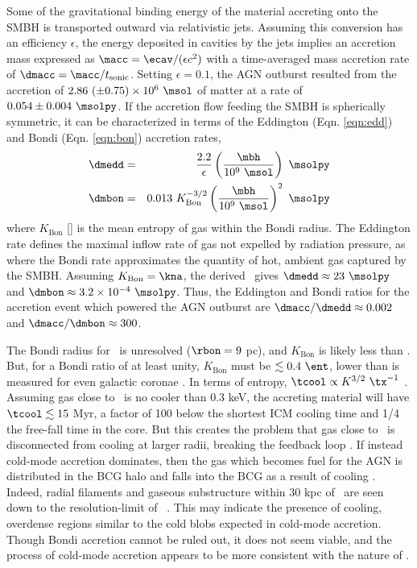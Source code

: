 \documentclass[useAMS,usenatbib]{mn2e}
\begin{document}
Some of the gravitational binding energy of the material accreting
onto the SMBH is transported outward via relativistic jets. Assuming
this conversion has an efficiency $\epsilon$, the energy deposited in
cavities by the jets implies an accretion mass expressed as $\macc =
\ecav/(\epsilon c^2)$ with a time-averaged mass accretion rate of
$\dmacc = \macc/t_{\mathrm{sonic}}$. Setting $\epsilon = 0.1$, the AGN
outburst resulted from the accretion of $2.86 ~(\pm 0.75) \times
10^{6} ~\msol$ of matter at a rate of $0.054 \pm 0.004 ~\msolpy$. If
the accretion flow feeding the SMBH is spherically symmetric, it can
be characterized in terms of the Eddington (Eqn. \ref{eqn:edd}) and
Bondi (Eqn. \ref{eqn:bon}) accretion rates,
\begin{eqnarray}
  \dmedd &=& \frac{2.2}{\epsilon} \left(\frac{\mbh}{10^9~\msol}\right)
  ~\msolpy  \label{eqn:edd}\\
  \dmbon &=& 0.013 ~K_{\mathrm{Bon}}^{-3/2} \left(\frac{\mbh}{10^9
    ~\msol}\right)^{2} ~\msolpy \label{eqn:bon}
\end{eqnarray}
where $K_{\mathrm{Bon}}$ [\ent] is the mean entropy of gas within the
Bondi radius. The Eddington rate defines the maximal inflow rate of
gas not expelled by radiation pressure, as where the Bondi rate
approximates the quantity of hot, ambient gas captured by the
SMBH. Assuming $K_{\mathrm{Bon}} = \kna$, the derived \mbh\ gives
$\dmedd \approx 23 ~\msolpy$ and $\dmbon \approx 3.2 \times 10^{-4}
~\msolpy$. Thus, the Eddington and Bondi ratios for the accretion
event which powered the AGN outburst are $\dmacc/\dmedd \approx 0.002$
and $\dmacc/\dmbon \approx 300$.

The Bondi radius for \irs\ is unresolved ($\rbon = 9$ pc), and
$K_{\mathrm{Bon}}$ is likely less than \kna. But, for a Bondi ratio of
at least unity, $K_{\mathrm{Bon}}$ must be $\la 0.4 ~\ent$, lower
than is measured for even galactic coronae \citep{coronae}. In terms
of entropy, $\tcool \propto K^{3/2} ~\tx^{-1}$ \citep{d06}. Assuming
gas close to \rbon\ is no cooler than 0.3 keV, the accreting material
will have $\tcool \la 15$ Myr, a factor of 100 below the shortest ICM
cooling time and 1/4 the free-fall time in the core. But this creates
the problem that gas close to \rbon\ is disconnected from cooling at
larger radii, breaking the feedback loop
\citep{2006NewA...12...38S}. If instead cold-mode accretion dominates,
then the gas which becomes fuel for the AGN is distributed in the BCG
halo and falls into the BCG as a result of cooling \citep{pizzolato05,
  2010arXiv1003.4181P}. Indeed, radial filaments and gaseous
substructure within 30 kpc of \irs\ are seen down to the
resolution-limit of \hst\ \citep{1999Ap&SS.266..113A}. This may
indicate the presence of cooling, overdense regions similar to the
cold blobs expected in cold-mode accretion. Though Bondi accretion
cannot be ruled out, it does not seem viable, and the process of
cold-mode accretion appears to be more consistent with the nature of
\irs.
\end{document}

